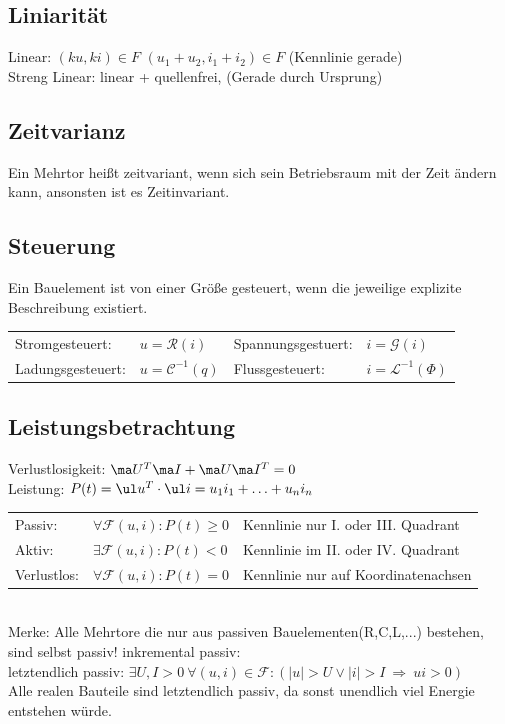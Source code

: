 \documentclass[fs, footer]{latex4ei}
\begin{document}
\begin{multicols*}{4}
	\subsection{Liniarität}
	Linear: $(ku, ki) \in F$ \quad $(u_1 + u_2, i_1 + i_2) \in F$ (Kennlinie gerade) \\
	Streng Linear: linear + quellenfrei, (Gerade durch Ursprung)\\

	\subsection{Zeitvarianz}
	Ein Mehrtor heißt zeitvariant, wenn sich sein Betriebsraum mit der Zeit ändern kann, ansonsten
	ist es Zeitinvariant.

	\subsection{Steuerung}
	Ein Bauelement ist von einer Größe gesteuert, wenn die jeweilige explizite Beschreibung existiert.\\
	\begin{tabular*}{\columnwidth}{@{\extracolsep\fill}llll@{}}
		Stromgesteuert: & $u=\mathcal R(i)$ & Spannungsgestuert: & $i=\mathcal G(i)$\\
		Ladungsgesteuert: & $u=\mathcal C^{-1}(q)$ & Flussgesteuert: & $i=\mathcal L^{-1}(\Phi)$
	\end{tabular*}

	\subsection{Leistungsbetrachtung}
	Verlustlosigkeit: $\ma U^T\ma I + \ma U\ma I^T = 0$\\
	Leistung: $P(t)=\ul u^T \cdot \ul i=u_1 i_1 + \dotsc + u_n i_n$ \\
	\begin{tabular*}{\columnwidth}{@{\extracolsep\fill}lll@{}}
		Passiv: & $\forall \mathcal F(u,i): P(t)\ge 0$ & Kennlinie nur I. oder III. Quadrant\\
		Aktiv: & $\exists \mathcal F(u,i): P(t)<0$ & Kennlinie im II. oder IV. Quadrant\\
		Verlustlos: & $\forall \mathcal F(u,i): P(t)=0$ & Kennlinie nur auf Koordinatenachsen\\
	\end{tabular*}\\
	Merke: Alle Mehrtore die nur aus passiven Bauelementen(R,C,L,...) bestehen, sind selbst passiv!
	inkremental passiv:\\
	letztendlich passiv: $\exists U,I>0 \ \forall (u,i) \in \mathcal F : (|u| > U \lor |i| > I \ \Rightarrow \ ui > 0)$\\
	Alle realen Bauteile sind letztendlich passiv, da sonst unendlich viel Energie entstehen würde.\\



\end{multicols*}
\end{document}
